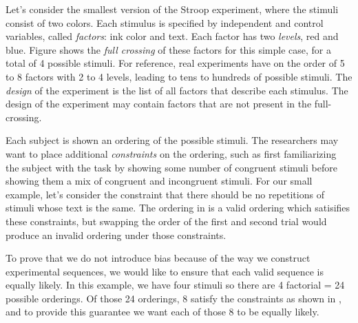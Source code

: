 Let's consider the smallest version of the Stroop experiment, where the stimuli consist of two colors. Each stimulus is specified by independent and control variables, called \emph{factors}: ink color and text. Each factor has two \emph{levels}, red and blue. Figure  shows the \emph{full crossing} of these factors for this simple case, for a total of 4 possible stimuli. For reference, real experiments have on the order of 5 to 8 factors with 2 to 4 levels, leading to tens to hundreds of possible stimuli. The \emph{design} of the experiment is the list of all factors that describe each stimulus. The design of the experiment may contain factors that are not present in the full-crossing.

Each subject is shown an ordering of the possible stimuli. The researchers may want to place additional \emph{constraints} on the ordering, such as first familiarizing the subject with the task by showing some number of congruent stimuli before showing them a mix of congruent and incongruent stimuli. For our small example, let's consider the constraint that there should be no repetitions of stimuli whose text is the same. The ordering in  is a valid ordering which satisifies these constraints, but swapping the order of the first and second trial would produce an invalid ordering under those constraints.

To prove that we do not introduce bias because of the way we construct experimental sequences, we would like to ensure that each valid sequence is equally likely. In this example, we have four stimuli so there are 4 factorial = 24 possible orderings. Of those 24 orderings, 8 satisfy the constraints as shown in , and to provide this guarantee we want each of those 8 to be equally likely.


